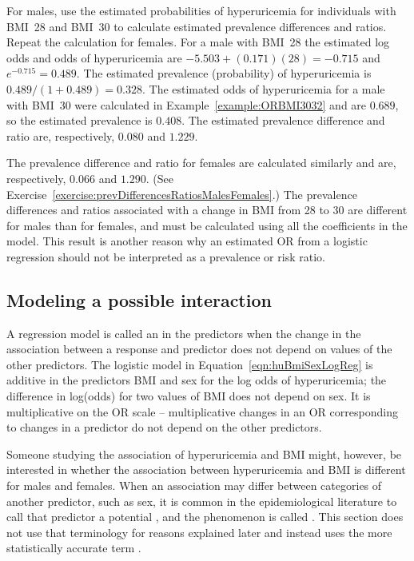 \begin{examplewrap}\label{example:probsDependOnOtherVars}
\begin{nexample}{For males, use the estimated probabilities of hyperuricemia for individuals with BMI~28 and BMI~30 to calculate estimated prevalence differences and ratios.  Repeat the calculation for females. }
For a male with BMI~28 the estimated log odds and odds of hyperuricemia are $-5.503 + (0.171)(28) = -0.715$ and  $e^{-0.715} = 0.489$.  The estimated prevalence (probability) of hyperuricemia is $0.489/(1 + 0.489) = 0.328$.  The estimated odds of hyperuricemia for a male with BMI~30 were calculated in Example~\ref{example:ORBMI3032} and are $0.689$, so the estimated prevalence is $0.408$.  The estimated prevalence difference and ratio are, respectively, $0.080$ and $1.229$.

The prevalence difference and ratio for females are calculated similarly and are, respectively, $0.066$ and $1.290$. (See Exercise~\ref{exercise:prevDifferencesRatiosMalesFemales}.)  The prevalence differences and ratios associated with a change in BMI from 28 to 30 are different for males than for females, and must be calculated using all the coefficients in the model.  This result is another reason why an estimated OR from a logistic regression should not be interpreted as a prevalence or risk ratio.

\end{nexample}
\end{examplewrap}


\subsection{Modeling a possible interaction}
\label{section:interactionLogisticRegression}

A regression model is called an  in the predictors when the change in the association between a response and predictor does not depend on values of the other predictors. The logistic model in Equation~\ref{eqn:huBmiSexLogReg} is additive in the predictors BMI and sex for the log odds of hyperuricemia; the difference in log(odds) for two values of BMI does not depend on sex. It is multiplicative on the OR scale -- multiplicative changes in an OR corresponding to changes in a predictor do not depend on the other predictors.

Someone studying the association of hyperuricemia and BMI might, however, be interested in whether the association between hyperuricemia and BMI is different for males and females. When an association may differ between categories of another predictor, such as sex, it is common in the epidemiological literature to call that predictor a potential , and the phenomenon is called .  This section does not use that terminology for reasons explained later and instead uses the more statistically accurate term .

